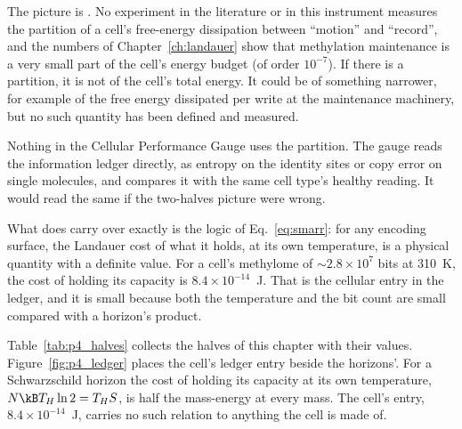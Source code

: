 \begin{keybox}[title=Status of the two-halves picture for a cell]
The picture is \conjecture. No experiment in the literature or in this instrument measures the
partition of a cell's free-energy dissipation between ``motion'' and ``record'', and the numbers of
Chapter~\ref{ch:landauer} show that methylation maintenance is a very small part of the cell's energy
budget (of order $10^{-7}$). If there is a partition, it is not of the cell's total energy. It could
be of something narrower, for example of the free energy dissipated per write at the maintenance
machinery, but no such quantity has been defined and measured. \openprob

Nothing in the Cellular Performance Gauge uses the partition. The gauge reads the information ledger
directly, as entropy on the identity sites or copy error on single molecules, and compares it with the same cell type's
healthy reading. It would read the same if the
two-halves picture were wrong.
\end{keybox}

What does carry over exactly is the logic of Eq.~\eqref{eq:smarr}: for any encoding surface, the
Landauer cost of what it holds, at its own temperature, is a physical quantity with a definite value.
For a cell's methylome of $\sim2.8\times10^7$ bits at 310~K, the cost of holding its capacity is
$8.4\times10^{-14}$~J. \calc{} That is the cellular entry in the ledger, and it is small because both
the temperature and the bit count are small compared with a horizon's product.

Table~\ref{tab:p4_halves} collects the halves of this chapter with their values. Figure~\ref{fig:p4_ledger} places the cell's ledger entry
beside the horizons'. For a Schwarzschild horizon the cost of holding its capacity at its own temperature, $N\kB T_H\ln2=T_HS$, is half the
mass-energy at every mass. The cell's entry, $8.4\times10^{-14}$~J, carries no such relation to anything the cell is made of. \calc


